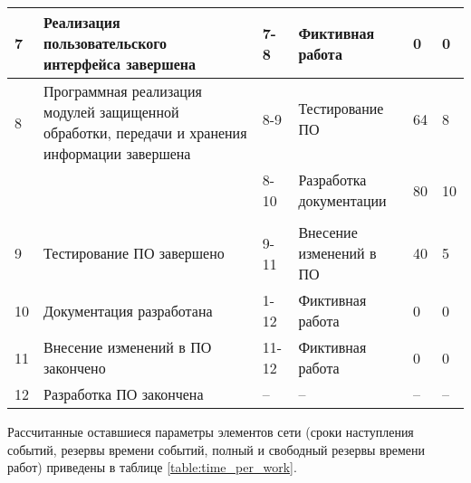 \begin{center}
\begin{longtable}[h]{| m{1cm} | m{4cm} | m{1cm} | m{5cm} | m{1cm} | m{1cm} |}
7 & Реализация пользовательского интерфейса завершена & 7-8 & Фиктивная работа & 0 & 0 \tabularnewline \hline

\multirow{6}{1cm}{8} & \multirow{6}{4cm}{Программная реализация модулей защищенной обработки, передачи и хранения информации завершена} & & & & \tabularnewline
 & & & & & \tabularnewline
 & & 8-9 & Тестирование ПО & 64 & 8 \tabularnewline 
 & & & & & \tabularnewline
 & & & & & \tabularnewline \cline{3-6} 
 & & & & & \tabularnewline
 & & 8-10 & Разработка документации & 80 & 10 \tabularnewline
 & & & & & \tabularnewline \hline

 9 & Тестирование ПО завершено & 9-11 & Внесение изменений в ПО & 40 & 5 \tabularnewline \hline

 10 & Документация разработана & 1-12 & Фиктивная работа & 0 & 0 \tabularnewline \hline

 11 & Внесение изменений в ПО закончено & 11-12 & Фиктивная работа & 0 & 0 \tabularnewline \hline

 12 & Разработка ПО закончена & -- & -- & -- & -- \tabularnewline \hline
\end{longtable}
\end{center}


Рассчитанные оставшиеся параметры элементов сети (сроки наступления событий, резервы времени событий, полный и свободный резервы времени работ) приведены в таблице \ref{table:time_per_work}.